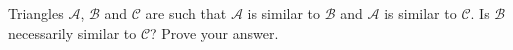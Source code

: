 Triangles $\mathcal{A}$, $\mathcal{B}$ and $\mathcal{C}$ are such that $\mathcal{A}$ is similar to $\mathcal{B}$ and $\mathcal{A}$ is similar to $\mathcal{C}$. Is $\mathcal{B}$ necessarily similar to $\mathcal{C}$? Prove your answer.
